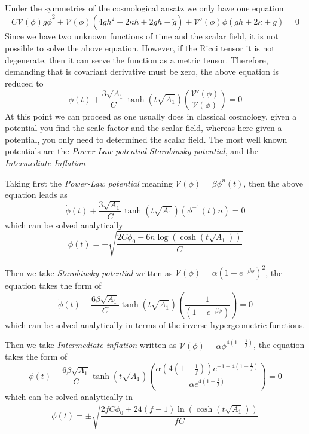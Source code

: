 \documentclass[10pt,a4paper]{article}
\begin{document}
Under the symmetries of the cosmological ansatz we only have one equation 
\begin{equation}
  C\mathcal{V}(\phi)g\dot{\phi}^2 + \mathcal{V}(\phi)\left(4gh^2 +2\kappa h + 2g\dot{h} - \ddot{g}\right) +
  \mathcal{V}'(\phi)\dot{\phi}\left(gh + 2\kappa + \dot{g}\right) = 0
\end{equation}
Since we have two unknown functions of time and the scalar field, it is not possible to solve the above equation. However, if the Ricci tensor
it is not degenerate, then it can serve the function as a metric tensor. Therefore, demanding that is covariant derivative must be zero, 
the above equation is reduced to
\begin{equation} 
  \dot{\phi}(t) + \frac{3\sqrt{A_1}}{C}\tanh\left(t\sqrt{A_1}\right)\left(\frac{\mathcal{V}'(\phi)}{\mathcal{V}(\phi)}\right) = 0
\end{equation}
At this point we can proceed as one usually does in classical cosmology, given a potential you find the scale factor and the scalar field, whereas 
here given a potential, you only need to determined the scalar field. The most well known potentials are the \textit{Power-Law potential}
\textit{Starobinsky potential}, and the \textit{Intermediate Inflation}

Taking first the \textit{Power-Law potential} meaning $\mathcal{V}(\phi) = \beta \phi^n(t)$, then the above equation leads as
\begin{equation}
  \dot{\phi}(t) + \frac{3\sqrt{A_1}}{C}\tanh\left(t\sqrt{A_1}\right)\left(\phi^{-1}(t)n\right) = 0
\end{equation}
which can be solved analytically
\begin{equation}
  \phi(t) = \pm \sqrt{\frac{2C\phi_0 - 6n\log(\cosh(t\sqrt{A_1}))}{C} }
\end{equation}

Then we take \textit{Starobinsky potential} written as $\mathcal{V}(\phi) =  \alpha \left(1 - e^{-\beta\phi}\right)^2$, the equation takes
the form of
\begin{equation}
  \dot{\phi}(t) - \frac{6\beta\sqrt{A_1}}{C}\tanh\left(t\sqrt{A_1}\right)\left(\frac{1}{\left(1 - e^{-\beta\phi}\right)}\right) = 0
\end{equation}
which can be solved analytically in terms of the inverse hypergeometric functions.

Then we take \textit{Intermediate inflation} written as $\mathcal{V}(\phi) =  \alpha \phi^{4\left(1-\frac{1}{f}\right)}$, the equation takes
the form of
\begin{equation}
  \dot{\phi}(t) - \frac{6\beta\sqrt{A_1}}{C}\tanh\left(t\sqrt{A_1}\right)\left(\frac{\alpha \left(4\left(1 - \frac{1}{f}\right)\right) e^{-1 + 4\left(1-\frac{1}{f}\right)}}{\alpha e^{4\left(1-\frac{1}{f}\right)}}\right) = 0
\end{equation}
which can be solved analytically in 
\begin{equation}
  \phi(t) = \pm \sqrt{\frac{2fC\phi_0 + 24(f-1)\ln(\cosh(t\sqrt{A_1}))}{fC}}
\end{equation}
\end{document}
